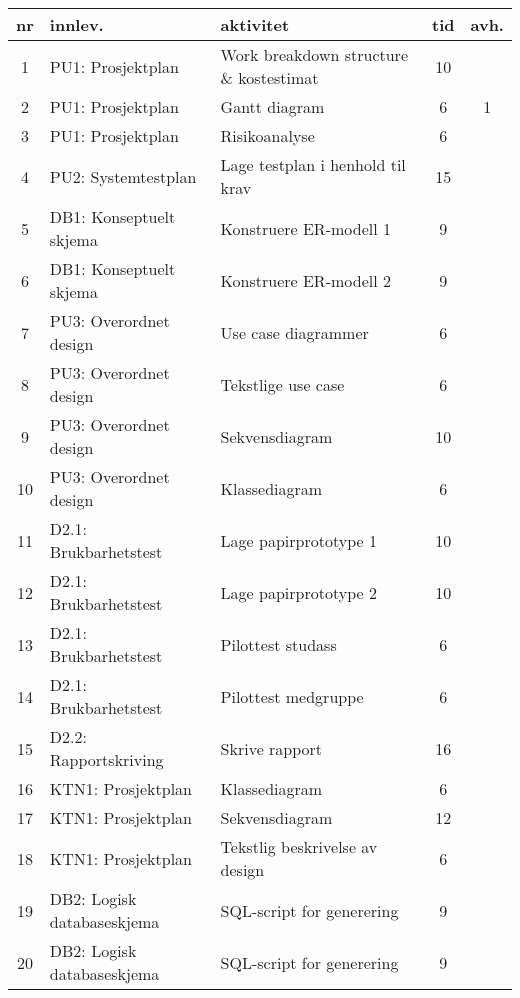 
\small
\begin{longtable}[l]{|c|l|l|c|c|}

	\hline
	\textbf{nr}& \textbf{innlev.}& \textbf{aktivitet}& \textbf{tid}& \textbf{avh.}\\ \hline
	1 & PU1: Prosjektplan & Work breakdown structure \& kostestimat & 10 & \\ \hline
	2 & PU1: Prosjektplan  & Gantt diagram & 6 & 1 \\ \hline
	3 & PU1: Prosjektplan  & Risikoanalyse & 6 & \\ \hline
	4 & PU2: Systemtestplan & Lage testplan i henhold til krav & 15 & \\ \hline
	5 & DB1: Konseptuelt skjema & Konstruere ER-modell 1 & 9 & \\ \hline
	6 & DB1: Konseptuelt skjema & Konstruere ER-modell 2 & 9 & \\ \hline
	7 & PU3: Overordnet design & Use case diagrammer & 6 & \\ \hline
	8 & PU3: Overordnet design  & Tekstlige use case & 6 & \\ \hline
	9 & PU3: Overordnet design  & Sekvensdiagram & 10 & \\ \hline
	10 & PU3: Overordnet design  & Klassediagram & 6 & \\ \hline
	11 & D2.1: Brukbarhetstest & Lage papirprototype 1& 10 & \\ \hline
	12 & D2.1: Brukbarhetstest & Lage papirprototype 2& 10 & \\ \hline
	13 & D2.1: Brukbarhetstest & Pilottest studass & 6 & \\ \hline
	14 & D2.1: Brukbarhetstest & Pilottest medgruppe & 6 & \\ \hline
	15 & D2.2: Rapportskriving & Skrive rapport & 16 & \\ \hline
	16 & KTN1: Prosjektplan & Klassediagram & 6 & \\ \hline
	17 & KTN1: Prosjektplan & Sekvensdiagram & 12 & \\ \hline
	18 & KTN1: Prosjektplan & Tekstlig beskrivelse av design & 6 & \\ \hline
	19 & DB2: Logisk databaseskjema & SQL-script for generering & 9 & \\ \hline
	20 & DB2: Logisk databaseskjema & SQL-script for generering & 9 & \\ \hline

\end{longtable}
